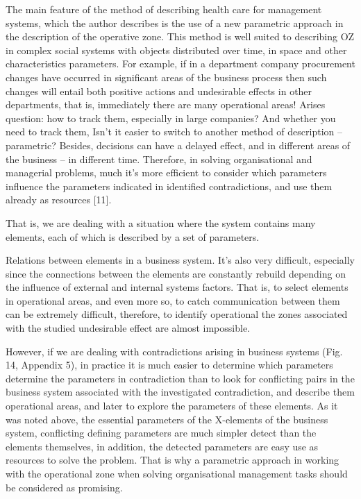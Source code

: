 \documentclass[11pt,a4paper]{book}
\begin{document}
The main feature of the method of describing health care for management
systems, which the author describes is the use of a new parametric approach in
the description of the operative zone. This method is well suited to
describing OZ in complex social systems with objects distributed over time, in
space and other characteristics parameters. For example, if in a department
company procurement changes have occurred in significant areas of the business
process then such changes will entail both positive actions and undesirable
effects in other departments, that is, immediately there are many operational
areas! Arises question: how to track them, especially in large companies? And
whether you need to track them, Isn’t it easier to switch to another method of
description -- parametric? Besides, decisions can have a delayed effect, and
in different areas of the business -- in different time. Therefore, in solving
organisational and managerial problems, much it’s more efficient to consider
which parameters influence the parameters indicated in identified
contradictions, and use them already as resources [11].

That is, we are dealing with a situation where the system contains many
elements, each of which is described by a set of parameters.

Relations between elements in a business system.  It’s also very difficult,
especially since the connections between the elements are constantly rebuild
depending on the influence of external and internal systems factors. That is,
to select elements in operational areas, and even more so, to catch
communication between them can be extremely difficult, therefore, to identify
operational the zones associated with the studied undesirable effect are
almost impossible.

However, if we are dealing with contradictions arising in business systems
(Fig. 14, Appendix 5), in practice it is much easier to determine which
parameters determine the parameters in contradiction than to look for
conflicting pairs in the business system associated with the investigated
contradiction, and describe them operational areas, and later to explore the
parameters of these elements. As it was noted above, the essential parameters
of the X-elements of the business system, conflicting defining parameters are
much simpler detect than the elements themselves, in addition, the detected
parameters are easy use as resources to solve the problem. That is why a
parametric approach in working with the operational zone when solving
organisational management tasks should be considered as promising.
\end{document}
